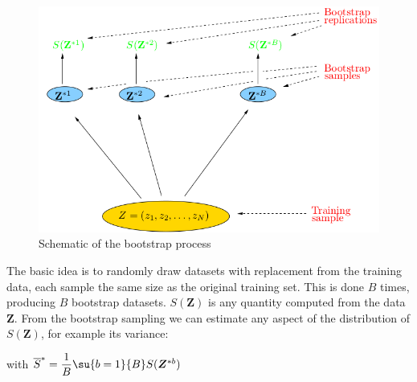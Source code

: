 \\

\begin{figure}[H]
	\begin{center}
		\includegraphics[width=.7\textwidth]{./chap/1chap/4sec/3_bootstrap.png}
	\end{center}
	\caption{Schematic of the bootstrap process}
	\label{fig:3_bootstrap}
\end{figure}

The basic idea is to randomly draw datasets with replacement from the training data, each sample
the same size as the original training set. This is done $B$ times, producing $B$ bootstrap datasets.
$S(\bm{Z})$ is any quantity computed from the data $\bm{Z}$. From the bootstrap sampling we can
estimate any aspect of the distribution of $S(\bm{Z})$, for example its variance:
\begin{center}
\end{center}
with $\overline{S}^{*}=\dfrac{1}{B}\su{{b=1}}{B}S(\bm{Z}^{*b})$
%
